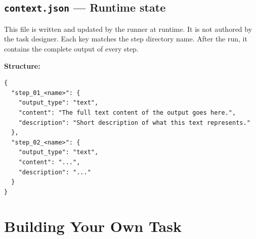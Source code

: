 \documentclass[12pt, a4paper]{article}
\begin{document}
\subsection{\texttt{context.json} --- Runtime state}

This file is written and updated by the runner at runtime. It is not authored by the task designer. Each key matches the step directory name. After the run, it contains the complete output of every step.

\textbf{Structure:}

\begin{lstlisting}[language={}]
{
  "step_01_<name>": {
    "output_type": "text",
    "content": "The full text content of the output goes here.",
    "description": "Short description of what this text represents."
  },
  "step_02_<name>": {
    "output_type": "text",
    "content": "...",
    "description": "..."
  }
}
\end{lstlisting}

\clearpage
\section{Building Your Own Task}
\end{document}
